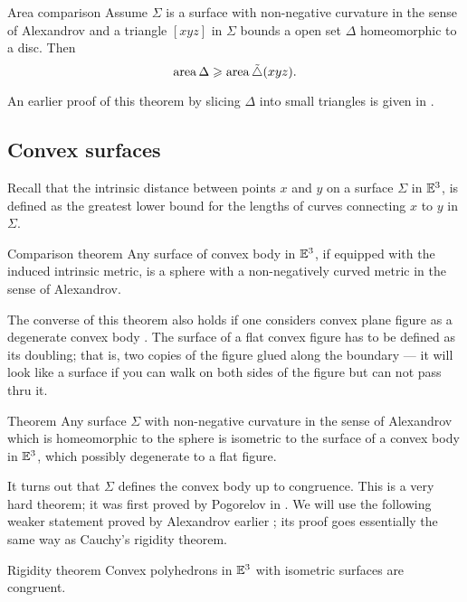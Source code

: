\documentclass[oneside,a4paper, 12pt]{article}
\begin{document}
\begin{thm}{Area comparison}\label{Area comparison}
Assume $\Sigma$ is a surface with non-negative curvature in the sense of Alexandrov
and a triangle $[xyz]$ in $\Sigma$ bounds a open set $\Delta$ homeomorphic to a disc.
Then 
\[\mathop{\rm area}\nolimits\Delta\geqslant \mathop{\rm area}\nolimits\tilde\triangle(xyz).\]
\end{thm}
An earlier proof of this theorem by slicing $\Delta$ into small triangles is given in \cite[X \S 1]{ aleksandrov1948vnutrennnyaya}.

\subsection*{Convex surfaces}

Recall that the intrinsic distance between points $x$ and $y$ on a surface $\Sigma$ in $\mathbb{E}^3$, is defined as the  greatest lower bound for the lengths of curves connecting $x$ to $y$ in $\Sigma$.

\begin{thm}{Comparison theorem}\label{Comparison theorem}
Any surface of convex body in $\mathbb{E}^3$,
if equipped with the induced intrinsic metric, 
is a sphere with a non-negatively curved metric in the sense of Alexandrov.
\end{thm}

The converse of this theorem also holds
if one considers convex plane figure as a degenerate convex body \cite[III \S 3]{aleksandrov1948vnutrennnyaya}.
The surface of a flat convex figure has to be defined as its doubling;
that is, two copies 
of the figure glued along the boundary --- it will look like a surface if you can walk on both sides of the figure but can not pass thru it.

\begin{thm}{Theorem}
Any surface $\Sigma$ with non-negative curvature in the sense of Alexandrov which is homeomorphic to the sphere
is isometric to the surface of a convex body in $\mathbb{E}^3$,
which possibly degenerate to a flat figure.
\end{thm}

It turns out that $\Sigma$ defines the convex body up to congruence.
This is a very hard theorem;
it was first proved by Pogorelov in \cite{pogorelov1952odnoznacnaya}.
We will use the following weaker statement proved by Alexandrov earlier 
\cite[VI \S 5]{aleksandrov1948vnutrennnyaya};
its proof goes essentially the same way as Cauchy's rigidity theorem.

\begin{thm}{Rigidity theorem}\label{Rigidity theorem}
Convex polyhedrons in $\mathbb{E}^3$ with isometric surfaces are congruent. 
\end{thm}
\end{document}
